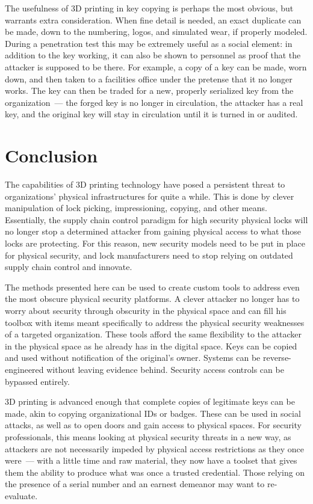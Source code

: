 \documentclass{acm_proc_article-sp}
\begin{document}
The usefulness of 3D printing in key copying is perhaps the most obvious, but warrants extra consideration. When fine detail is needed, an exact duplicate can be made, down to the numbering, logos, and simulated wear, if properly modeled. During a penetration test this may be extremely useful as a social element: in addition to the key working, it can also be shown to personnel as proof that the attacker is supposed to be there. For example, a copy of a key can be made, worn down, and then taken to a facilities office under the pretense that it no longer works. The key can then be traded for a new, properly serialized key from the organization~--- the forged key is no longer in circulation, the attacker has a real key, and the original key will stay in circulation until it is turned in or audited.

\section{Conclusion}
The capabilities of 3D printing technology have posed a persistent threat to organizations' physical infrastructures for quite a while. This is done by clever manipulation of lock picking, impressioning, copying, and other means. Essentially, the supply chain control paradigm for high security physical locks will no longer stop a determined attacker from gaining physical access to what those locks are protecting. For this reason, new security models need to be put in place for physical security, and lock manufacturers need to stop relying on outdated supply chain control and innovate.

The methods presented here can be used to create custom tools to address even the most obscure physical security platforms. A clever attacker no longer has to worry about security through obscurity in the physical space and can fill his toolbox with items meant specifically to address the physical security weaknesses of a targeted organization. These tools afford the same flexibility to the attacker in the physical space as he already has in the digital space. Keys can be copied and used without notification of the original's owner. Systems can be reverse-engineered without leaving evidence behind. Security access controls can be bypassed entirely.

3D printing is advanced enough that complete copies of legitimate keys can be made, akin to copying organizational IDs or badges. These can be used in social attacks, as well as to open doors and gain access to physical spaces. For security professionals, this means looking at physical security threats in a new way, as attackers are not necessarily impeded by physical access restrictions as they once were~--- with a little time and raw material, they now have a toolset that gives them the ability to produce what was once a trusted credential. Those relying on the presence of a serial number and an earnest demeanor may want to re-evaluate.

% 


\nocite{*}
\balancecolumns
\end{document}
